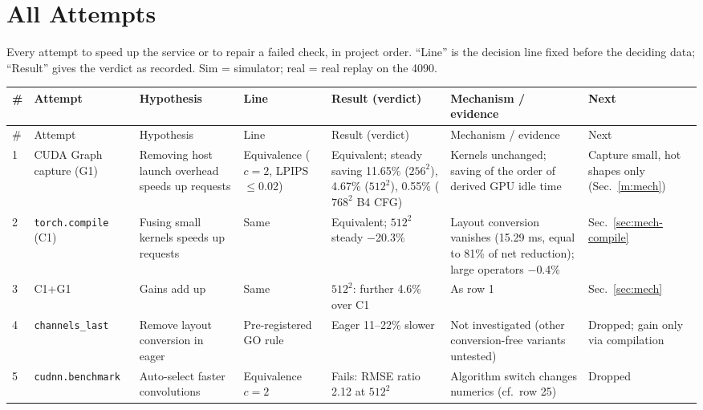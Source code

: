 \documentclass[conference]{IEEEtran}
\newcommand{\tn}[1]{#1}%
\begin{document}
\section{All Attempts}\label{app:attempts}
Every attempt to speed up the service or to repair a failed check, in project order. ``Line'' is the decision line fixed before the deciding data; ``Result'' gives the verdict as recorded. Sim = simulator; real = real replay on the 4090.

{\scriptsize
\setlength{\tabcolsep}{2pt}
\begin{longtable}{@{}P{0.4cm}P{2.2cm}P{2.6cm}P{2.6cm}P{3.3cm}P{3.2cm}P{2.2cm}@{}}
\toprule
\# & Attempt & Hypothesis & Line & Result (verdict) & Mechanism / evidence & Next\\
\midrule
\endfirsthead
\toprule
\# & Attempt & Hypothesis & Line & Result (verdict) & Mechanism / evidence & Next\\
\midrule
\endhead
\bottomrule
\endfoot
1 & CUDA Graph capture (G1) & Removing host launch overhead speeds up requests & Equivalence ($c{=}2$, LPIPS $\le$0.02) & Equivalent; steady saving \tn{11.65\%} ($256^2$), \tn{4.67\%} ($512^2$), \tn{0.55\%} ($768^2$ B4 CFG) & Kernels unchanged; saving of the order of derived GPU idle time & Capture small, hot shapes only (Sec.~\ref{m:mech})\\
2 & \texttt{torch.compile} (C1) & Fusing small kernels speeds up requests & Same & Equivalent; $512^2$ steady \tn{$-$20.3\%} & Layout conversion vanishes (\tn{15.29 ms}, equal to \tn{81\%} of net reduction); large operators \tn{$-$0.4\%} & Sec.~\ref{sec:mech-compile}\\
3 & C1+G1 & Gains add up & Same & $512^2$: further \tn{4.6\%} over C1 & As row 1 & Sec.~\ref{sec:mech}\\
4 & \texttt{channels\_last} & Remove layout conversion in eager & Pre-registered GO rule & Eager \tn{11--22\%} slower & Not investigated (other conversion-free variants untested) & Dropped; gain only via compilation\\
5 & \texttt{cudnn.benchmark} & Auto-select faster convolutions & Equivalence $c{=}2$ & Fails: RMSE ratio \tn{2.12} at $512^2$ & Algorithm switch changes numerics (cf.\ row 25) & Dropped\\

\end{longtable}}
\end{document}
